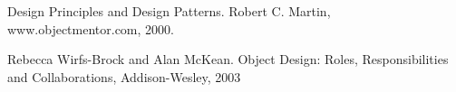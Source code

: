 \documentclass[a4paper,10pt]{article}
\begin{document}



\begin{thebibliography}{9}  
  Design Principles and Design Patterns. Robert C. Martin,
www.objectmentor.com, 2000.
  
  Rebecca Wirfs-Brock and Alan McKean. Object Design: Roles, Responsibilities
and Collaborations, Addison-Wesley, 2003  

  
\end{thebibliography}
\end{document}
